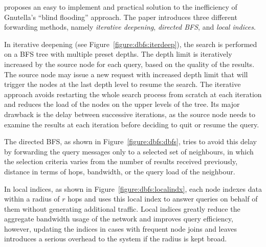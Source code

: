 \cite{yang_improvep2psearch_2002} proposes an easy to implement and practical
solution to the inefficiency of Gnutella's ``blind flooding'' approach. The
paper introduces three different forwarding methods, namely \emph{iterative
deepening}, \emph{directed BFS}, and \emph{local indices}.

In iterative deepening (see Figure~\ref{figure:dbfs:iterdeep}), the search is
performed on a BFS tree with multiple preset depths. The depth limit is
iteratively increased by the source node for each query, based on the quality of
the results. The source node may issue a new request with increased depth limit
that will trigger the nodes at the last depth level to resume the search. The
iterative approach avoids restarting the whole search process from scratch at
each iteration and reduces the load of the nodes on the upper levels of the
tree. Its major drawback is the delay between successive iterations, as the
source node needs to examine the results at each iteration before deciding to
quit or resume the query.

The directed BFS, as shown in Figure~\ref{figure:dbfs:dbfs}, tries to avoid this
delay by forwarding the query messages only to a selected set of neighbours, in
which the selection criteria varies from the number of results received
previously, distance in terms of hops, bandwidth, or the query load of the
neighbour.

In local indices, as shown in Figure~\ref{figure:dbfs:localindx}, each node
indexes data within a radius of $r$ hops and uses this local index to answer
queries on behalf of them without generating additional traffic. Local indices
greatly reduce the aggregate bandwidth usage of the network and improves query
efficiency, however, updating the indices in cases with frequent node joins and
leaves introduces a serious overhead to the system if the radius is kept broad.

